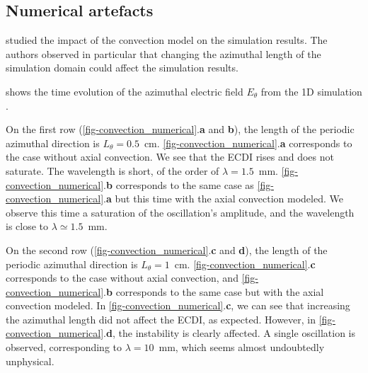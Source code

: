   \subsection{Numerical artefacts}
    \citet{lafleur2016a} studied the impact of the convection model on the simulation results.
    The authors observed in particular that changing the azimuthal length of the simulation domain could affect the simulation results.

     shows the time evolution of the azimuthal electric field $E_{\theta}$ from the \ac{1D} simulation \citep{lafleur2016a}.

    On the first row (\cref{fig-convection_numerical}.{\bf a} and {\bf b}), the length of the periodic azimuthal direction is $L_{\theta}=0.5$~cm.
    \cref{fig-convection_numerical}.{\bf a} corresponds to the case without axial convection.
    We see that the \ac{ECDI} rises and does not saturate.
    The wavelength is short, of the order of $\lambda = 1.5$~mm.
    \cref{fig-convection_numerical}.{\bf b} corresponds to the same case as \cref{fig-convection_numerical}.{\bf a} but this time with the axial convection modeled.
    We observe this time a saturation of the oscillation's amplitude, and the wavelength is close to $\lambda \simeq 1.5$~mm.

    On the second row (\cref{fig-convection_numerical}.{\bf c} and {\bf d}), the length of the periodic azimuthal direction is $L_{\theta}=1$~cm.
    \cref{fig-convection_numerical}.{\bf c} corresponds to the case without axial convection, and \cref{fig-convection_numerical}.{\bf b} corresponds to the same case but with the axial convection modeled.
    In \cref{fig-convection_numerical}.{\bf c}, we can see that increasing the azimuthal length did not affect the \ac{ECDI}, as expected.
    However, in  \cref{fig-convection_numerical}.{\bf d}, the instability is clearly affected.
    A single oscillation is observed, corresponding to $\lambda=10$~mm, which seems almost undoubtedly unphysical.

